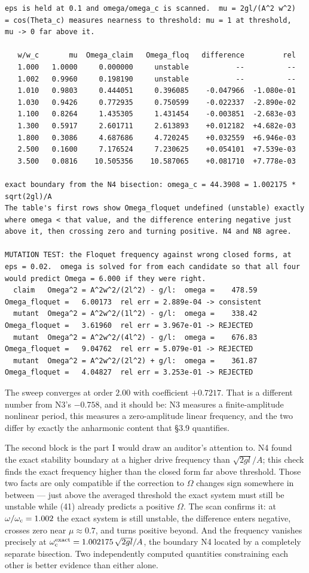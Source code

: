\documentclass[11pt,a4paper]{article}
\begin{document}
\begin{lstlisting}
eps is held at 0.1 and omega/omega_c is scanned.  mu = 2gl/(A^2 w^2)
= cos(Theta_c) measures nearness to threshold: mu = 1 at threshold,
mu -> 0 far above it.

   w/w_c       mu  Omega_claim   Omega_floq   difference         rel
   1.000   1.0000     0.000000     unstable           --          --
   1.002   0.9960     0.198190     unstable           --          --
   1.010   0.9803     0.444051     0.396085    -0.047966  -1.080e-01
   1.030   0.9426     0.772935     0.750599    -0.022337  -2.890e-02
   1.100   0.8264     1.435305     1.431454    -0.003851  -2.683e-03
   1.300   0.5917     2.601711     2.613893    +0.012182  +4.682e-03
   1.800   0.3086     4.687686     4.720245    +0.032559  +6.946e-03
   2.500   0.1600     7.176524     7.230625    +0.054101  +7.539e-03
   3.500   0.0816    10.505356    10.587065    +0.081710  +7.778e-03

exact boundary from the N4 bisection: omega_c = 44.3908 = 1.002175 * sqrt(2gl)/A
The table's first rows show Omega_floquet undefined (unstable) exactly
where omega < that value, and the difference entering negative just
above it, then crossing zero and turning positive. N4 and N8 agree.

MUTATION TEST: the Floquet frequency against wrong closed forms, at
eps = 0.02.  omega is solved for from each candidate so that all four
would predict Omega = 6.000 if they were right.
  claim   Omega^2 = A^2w^2/(2l^2) - g/l:  omega =    478.59  Omega_floquet =   6.00173  rel err = 2.889e-04 -> consistent
  mutant  Omega^2 = A^2w^2/(1l^2) - g/l:  omega =    338.42  Omega_floquet =   3.61960  rel err = 3.967e-01 -> REJECTED
  mutant  Omega^2 = A^2w^2/(4l^2) - g/l:  omega =    676.83  Omega_floquet =   9.04762  rel err = 5.079e-01 -> REJECTED
  mutant  Omega^2 = A^2w^2/(2l^2) + g/l:  omega =    361.87  Omega_floquet =   4.04827  rel err = 3.253e-01 -> REJECTED
\end{lstlisting}

The sweep converges at order \(2.00\) with coefficient \(+0.7217\). That is a
different number from N3's \(-0.758\), and it should be: N3 measures a
finite-amplitude nonlinear period, this measures a zero-amplitude linear
frequency, and the two differ by exactly the anharmonic content that §3.9
quantifies.

The second block is the part I would draw an auditor's attention to. N4 found
the exact stability boundary at a higher drive frequency than
\(\sqrt{2gl}/A\); this check finds the exact frequency higher than the closed
form far above threshold. Those two facts are only compatible if the correction
to \(\Omega\) changes sign somewhere in between --- just above the averaged
threshold the exact system must still be unstable while (41) already predicts a
positive \(\Omega\). The scan confirms it: at \(\omega/\omega_{\rm c}=1.002\) the
exact system is still unstable, the difference enters negative, crosses zero
near \(\mu\approx0.7\), and turns positive beyond. And the frequency vanishes
precisely at \(\omega_{\rm c}^{\rm exact}=1.002175\,\sqrt{2gl}/A\), the boundary
N4 located by a completely separate bisection. Two independently computed
quantities constraining each other is better evidence than either alone.
\end{document}

